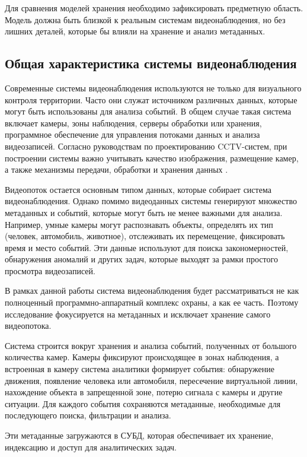 Для сравнения моделей хранения необходимо зафиксировать предметную область.
Модель должна быть близкой к реальным системам видеонаблюдения, но
без лишних деталей, которые бы влияли на хранение и анализ метаданных.

\subsection{Общая характеристика системы видеонаблюдения}

Современные системы видеонаблюдения используются не только для визуального
контроля территории. Часто они служат источником различных данных, которые могут
быть использованы для анализа событий.
В общем случае такая система включает камеры, зоны наблюдения,
серверы обработки или хранения, программное обеспечение для управления
потоками данных и анализа видеозаписей. Согласно руководствам по
проектированию CCTV-систем, при построении системы важно учитывать
качество изображения, размещение камер, а также механизмы передачи,
обработки и хранения данных \cite{dhs_cctv_handbook}.


Видеопоток остается основным типом данных, которые собирает система
видеонаблюдения. Однако помимо видеоданных системы генерируют множество
метаданных и событий, которые могут быть не менее важными для анализа.
Например, умные камеры могут распознавать объекты, определять их тип (человек, автомобиль, животное),
отслеживать их перемещение, фиксировать время и место событий.
Эти данные используют для поиска закономерностей, обнаружения аномалий и
других задач, которые выходят за рамки простого просмотра видеозаписей.

В рамках данной работы система видеонаблюдения будет рассматриваться не как
полноценный программно-аппаратный комплекс охраны, а как ее часть. 
Поэтому исследование фокусируется на метаданных и
исключает хранение самого видеопотока.

Система строится вокруг хранения и анализа событий,
полученных от большого количества камер. Камеры фиксируют происходящее в
зонах наблюдения, а встроенная в камеру система аналитики формирует события:
обнаружение движения, появление человека или автомобиля, пересечение виртуальной линии,
нахождение объекта в запрещенной зоне, потерю сигнала с камеры и другие ситуации.
Для каждого события сохраняются метаданные, необходимые для последующего поиска,
фильтрации и анализа.

Эти метаданные загружаются в СУБД, которая обеспечивает их хранение, индексацию и
доступ для аналитических задач.

